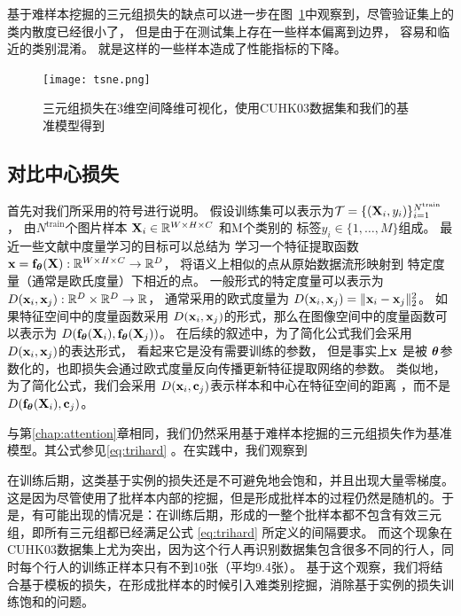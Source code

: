 基于难样本挖掘的三元组损失的缺点可以进一步在图~\ref{fig:tsne}中观察到，尽管验证集上的类内散度已经很小了，
但是由于在测试集上存在一些样本偏离到边界，
容易和临近的类别混淆。
就是这样的一些样本造成了性能指标的下降。

\begin{figure}
	\centering
	\texttt{[image: tsne.png]}
	\caption{三元组损失在3维空间降维可视化，使用CUHK03数据集和我们的基准模型得到}
	\label{fig:tsne}
\end{figure}

\subsection{对比中心损失}

首先对我们所采用的符号进行说明。
假设训练集可以表示为$\mathcal{T}=\{({\mathbf{X}}_i,y_i)\}_{i=1}^{N^{\textrm{train}}}$， 由$N^{\textrm{train}}$个图片样本
${\mathbf{X}}_i \in {\mathbb{R}}^{W\times H\times C}$
和M个类别的
标签$y_i \in \{1,\dots, M\}$组成。
最近一些文献中度量学习的目标可以总结为
学习一个特征提取函数
${\mathbf{x}} = {\mathbf{f}}_{\boldsymbol{\theta}} ({\mathbf{X}}): {\mathbb{R}}^{W \times H\times C} \rightarrow \mathbb{R}^D$，
将语义上相似的点从原始数据流形映射到
特定度量（通常是欧氏度量）下相近的点。
一般形式的特定度量可以表示为$D( {\mathbf{x}}_i, {\mathbf{x}}_j):\mathbb{R}^D \times \mathbb{R}^D \rightarrow \mathbb{R}$，
通常采用的欧式度量为
$D({\mathbf{x}}_i,{\mathbf{x}}_j)=\|{\mathbf{x}}_i - {\mathbf{x}}_j\|_2^2$。
如果特征空间中的度量函数采用
$D({\mathbf{x}}_i,  {\mathbf{x}}_j)$的形式，那么在图像空间中的度量函数可以表示为
$D({\mathbf{f}}_{\boldsymbol{\theta}}({\mathbf{X}}_i), {\mathbf{f}}_{\boldsymbol{\theta}}({\mathbf{X}}_j))$。
在后续的叙述中，为了简化公式我们会采用$D({\mathbf{x}}_i,  {\mathbf{x}}_j)$的表达形式，
看起来它是没有需要训练的参数，
但是事实上${\mathbf{x}}$ 是被 ${\boldsymbol{\theta}}$参数化的，也即损失会通过欧式度量反向传播更新特征提取网络的参数。
类似地，
为了简化公式，我们会采用
$D({\mathbf{x}}_i,{\mathbf{c}}_j)$表示样本和中心在特征空间的距离
，而不是$D({\mathbf{f}}_{\boldsymbol{\theta}}({\mathbf{X}}_i), {\mathbf{c}}_j)$。

与第\ref{chap:attention}章相同，我们仍然采用基于难样本挖掘的三元组损失作为基准模型。其公式参见\ref{eq:trihard} 。在实践中，我们观察到

在训练后期，这类基于实例的损失还是不可避免地会饱和，并且出现大量零梯度。这是因为尽管使用了批样本内部的挖掘，但是形成批样本的过程仍然是随机的。于是，有可能出现的情况是：在训练后期，形成的一整个批样本都不包含有效三元组，即所有三元组都已经满足公式
\ref{eq:trihard}
所定义的间隔要求。
而这个现象在CUHK03数据集上尤为突出，因为这个行人再识别数据集包含很多不同的行人，同时每个行人的训练正样本只有不到10张（平均9.4张）。
基于这个观察，我们将结合基于模板的损失，在形成批样本的时候引入难类别挖掘，消除基于实例的损失训练饱和的问题。


